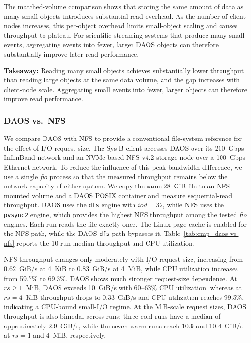 The matched-volume comparison shows that storing the same amount of data as many small objects introduces substantial read overhead. As the number of client nodes increases, this per-object overhead limits small-object scaling and causes throughput to plateau. For scientific streaming systems that produce many small events, aggregating events into fewer, larger DAOS objects can therefore substantially improve later read performance.



\begin{takeaway}
\textbf{Takeaway:} Reading many small objects achieves substantially lower throughput than reading large objects at the same data volume, and the gap increases with client-node scale. Aggregating small events into fewer, larger objects can therefore improve read performance.
\end{takeaway}


\subsubsection{DAOS vs.\ NFS}

We compare DAOS with NFS to provide a conventional file-system reference for the effect of I/O request size. The Sys-B client accesses DAOS over its 200~Gbps InfiniBand network and an NVMe-based NFS v4.2 storage node over a 100~Gbps Ethernet network. To reduce the influence of this peak-bandwidth difference, we use a single \textit{fio} process so that the measured throughput remains below the network capacity of either system. We copy the same 28~GiB file to an NFS-mounted volume and a DAOS POSIX container and measure sequential-read throughput. DAOS uses the \texttt{dfs} engine with $iod{=}32$, while NFS uses the \texttt{pvsync2} engine, which provides the highest NFS throughput among the tested \textit{fio} engines. Each run reads the file exactly once. The Linux page cache is enabled for the NFS path, while the DAOS \texttt{dfs} path bypasses it. Table~\ref{tab:cmp_daos-vs-nfs} reports the 10-run median throughput and CPU utilization.



NFS throughput changes only moderately with I/O request size, increasing from 0.62~GiB/s at 4~KiB to 0.83~GiB/s at 4~MiB, while CPU utilization increases from 59.7\% to 69.3\%. DAOS shows much stronger request-size dependence. At $rs{\geq}1$~MiB, DAOS exceeds 10~GiB/s with 60--63\% CPU utilization, whereas at $rs{=}4$~KiB throughput drops to 0.33~GiB/s and CPU utilization reaches 99.5\%, indicating a CPU-bound small-I/O regime. At the MiB-scale request sizes, DAOS throughput is also bimodal across runs: three cold runs have a median of approximately 2.9~GiB/s, while the seven warm runs reach 10.9 and 10.4~GiB/s at $rs{=}1$ and 4~MiB, respectively.




